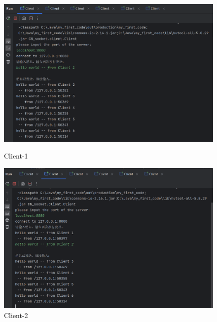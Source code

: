 \documentclass{article}
\begin{document}
	\begin{figure}[H]
		\centering
		\begin{minipage}[b]{0.45\textwidth}
			\includegraphics[width=\textwidth]{./images/2.支持5个以上客户端同时发送消息并逐一打印-Client1.png}
			\caption{Client-1}
		\end{minipage}
		\hfill
		\begin{minipage}[b]{0.45\textwidth}
			\includegraphics[width=\textwidth]{./images/2.支持5个以上客户端同时发送消息并逐一打印-Client2.png}
			\caption{Client-2}
		\end{minipage}
	\end{figure}
	
\end{document}

